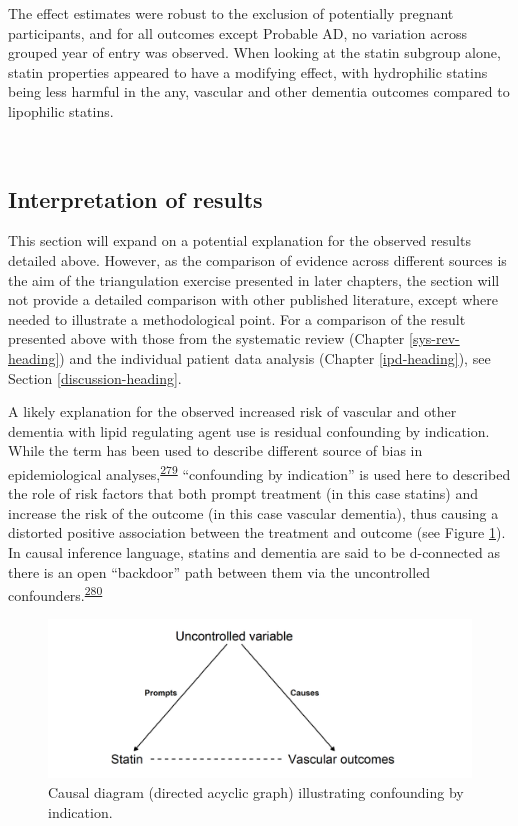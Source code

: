 \documentclass[a4paper, twoside]{templates/ociamthesis}
\begin{document}
The effect estimates were robust to the exclusion of potentially pregnant participants, and for all outcomes except Probable AD, no variation across grouped year of entry was observed. When looking at the statin subgroup alone, statin properties appeared to have a modifying effect, with hydrophilic statins being less harmful in the any, vascular and other dementia outcomes compared to lipophilic statins.

~

\hypertarget{interpretation-of-results}{%
\subsection{Interpretation of results}\label{interpretation-of-results}}

This section will expand on a potential explanation for the observed results detailed above. However, as the comparison of evidence across different sources is the aim of the triangulation exercise presented in later chapters, the section will not provide a detailed comparison with other published literature, except where needed to illustrate a methodological point. For a comparison of the result presented above with those from the systematic review (Chapter \ref{sys-rev-heading}) and the individual patient data analysis (Chapter \ref{ipd-heading}), see Section \ref{discussion-heading}.

A likely explanation for the observed increased risk of vascular and other dementia with lipid regulating agent use is residual confounding by indication. While the term has been used to describe different source of bias in epidemiological analyses,\textsuperscript{\protect\hyperlink{ref-salas1999}{279}} ``confounding by indication'' is used here to described the role of risk factors that both prompt treatment (in this case statins) and increase the risk of the outcome (in this case vascular dementia), thus causing a distorted positive association between the treatment and outcome (see Figure \ref{fig:indicationBias}). In causal inference language, statins and dementia are said to be d-connected as there is an open ``backdoor'' path between them via the uncontrolled confounders.\textsuperscript{\protect\hyperlink{ref-suttorp2015}{280}}





\begin{figure}[H]
\includegraphics[width=1\linewidth]{figures/cprd-analysis/indicationBias} \caption[Confounding by indication causal diagram]{Causal diagram (directed acyclic graph) illustrating confounding by indication.}\label{fig:indicationBias}
\end{figure}
\end{document}

